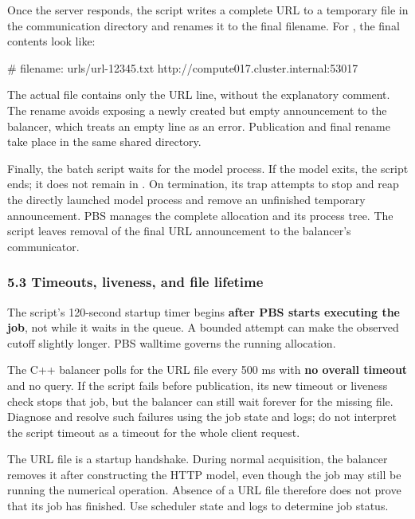 \documentclass[
  11pt,
  a4paper,
]{article}
\newenvironment{Shaded}{}{}
\newcommand{\NormalTok}[1]{#1}
\DeclareRobustCommand{\InlineCode}[1]{{\ttfamily\upshape\seqsplit{#1}}}
\renewenvironment{Shaded}{\begin{snugshade}}{\end{snugshade}}
\begin{document}
Once the server responds, the script writes a complete URL to a
temporary file in the communication directory and renames it to the
final filename. For \InlineCode{PBS\_JOBID=12345.pbs01}, the final
contents look like:


\begin{Shaded}
\begin{Highlighting}[]
\NormalTok{\# filename: urls/url{-}12345.txt}
\NormalTok{http://compute017.cluster.internal:53017}
\end{Highlighting}
\end{Shaded}

The actual file contains only the URL line, without the explanatory
comment. The rename avoids exposing a newly created but empty
announcement to the balancer, which treats an empty line as an error.
Publication and final rename take place in the same shared directory.

Finally, the batch script waits for the model process. If the model
exits, the script ends; it does not remain in
\InlineCode{sleep\space{}infinity}. On termination, its trap attempts to
stop and reap the directly launched model process and remove an
unfinished temporary announcement. PBS manages the complete allocation
and its process tree. The script leaves removal of the final URL
announcement to the balancer's communicator.

\hypertarget{timeouts-liveness-and-file-lifetime}{%
\subsubsection{5.3 Timeouts, liveness, and file
lifetime}\label{timeouts-liveness-and-file-lifetime}}

The script's 120-second startup timer begins \textbf{after PBS starts
executing the job}, not while it waits in the queue. A bounded
\InlineCode{curl} attempt can make the observed cutoff slightly longer.
PBS walltime governs the running allocation.

The C++ balancer polls for the URL file every 500 ms with \textbf{no
overall timeout} and no \InlineCode{qstat} query. If the script fails
before publication, its new timeout or liveness check stops that job,
but the balancer can still wait forever for the missing file. Diagnose
and resolve such failures using the job state and logs; do not interpret
the script timeout as a timeout for the whole client request.

The URL file is a startup handshake. During normal acquisition, the
balancer removes it after constructing the HTTP model, even though the
job may still be running the numerical operation. Absence of a URL file
therefore does not prove that its job has finished. Use scheduler state
and logs to determine job status.
\end{document}
